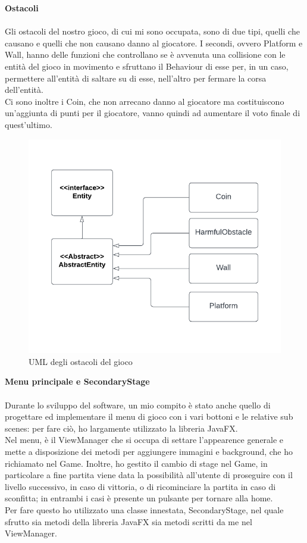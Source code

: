 \documentclass{article}
\begin{document}
\newpage
\textbf{Ostacoli}\\
\\
Gli ostacoli del nostro gioco, di cui mi sono occupata, sono di due tipi, quelli che causano e quelli che non causano danno al giocatore. I secondi, ovvero Platform e Wall, hanno delle funzioni che controllano se è avvenuta una collisione con le entità del gioco in movimento e sfruttano il Behaviour di esse per, in un caso, permettere all'entità di saltare su di esse, nell'altro per fermare la corsa dell'entità.\\
Ci sono inoltre i Coin, che non arrecano danno al giocatore ma costituiscono un'aggiunta di punti per il giocatore, vanno quindi ad aumentare il voto finale di quest'ultimo.\\

\begin{figure}[ht]
\includegraphics[width=1\textwidth]{umlObstacles.png}
\caption{UML degli ostacoli del gioco}
\label{fig:schgen}
\end{figure}

\newpage
\textbf{Menu principale e SecondaryStage}\\
\\
Durante lo sviluppo del software, un mio compito è stato anche quello di progettare ed implementare il menu di gioco con i vari bottoni e le relative sub scenes: per fare ciò, ho largamente utilizzato la libreria JavaFX.\\
Nel menu, è il ViewManager che si occupa di settare l'appearence generale e mette a disposizione dei metodi per aggiungere immagini e background, che ho richiamato nel Game.
Inoltre, ho gestito il cambio di stage nel Game, in particolare a fine partita viene data la possibilità all'utente di proseguire con il livello successivo, in caso di vittoria, o di ricominciare la partita in caso di sconfitta; in entrambi i casi è presente un pulsante per tornare alla home.\\
Per fare questo ho utilizzato una classe innestata, SecondaryStage, nel quale sfrutto sia metodi della libreria JavaFX sia metodi scritti da me nel ViewManager.
\end{document}
